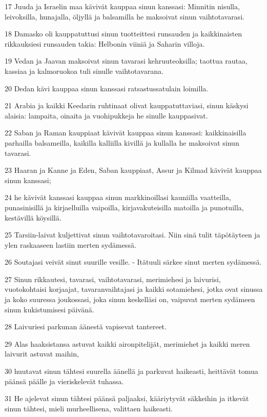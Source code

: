 \par 17 Juuda ja Israelin maa kävivät kauppaa sinun kanssasi: Minnitin nisulla, leivoksilla, hunajalla, öljyllä ja balsamilla he maksoivat sinun vaihtotavarasi.
\par 18 Damasko oli kauppatuttusi sinun tuotteittesi runsauden ja kaikkinaisten rikkauksiesi runsauden takia: Helbonin viiniä ja Saharin villoja.
\par 19 Vedan ja Jaavan maksoivat sinun tavarasi kehruuteoksilla; taottua rautaa, kassiaa ja kalmoruokoa tuli sinulle vaihtotavarana.
\par 20 Dedan kävi kauppaa sinun kanssasi ratsastussatulain loimilla.
\par 21 Arabia ja kaikki Keedarin ruhtinaat olivat kauppatuttaviasi, sinun käskysi alaisia: lampaita, oinaita ja vuohipukkeja he sinulle kauppasivat.
\par 22 Saban ja Raman kauppiaat kävivät kauppaa sinun kanssasi: kaikkinaisilla parhailla balsameilla, kaikilla kalliilla kivillä ja kullalla he maksoivat sinun tavarasi.
\par 23 Haaran ja Kanne ja Eden, Saban kauppiaat, Assur ja Kilmad kävivät kauppaa sinun kanssasi;
\par 24 he kävivät kanssasi kauppaa sinun markkinoillasi kauniilla vaatteilla, punasinisillä ja kirjaelluilla vaipoilla, kirjavakuteisilla matoilla ja punotuilla, kestävillä köysillä.
\par 25 Tarsiin-laivat kuljettivat sinun vaihtotavaroitasi. Niin sinä tulit täpötäyteen ja ylen raskaaseen lastiin merten sydämessä.
\par 26 Soutajasi veivät sinut suurille vesille. - Itätuuli särkee sinut merten sydämessä.
\par 27 Sinun rikkautesi, tavarasi, vaihtotavarasi, merimiehesi ja laivurisi, vuotokohtaisi korjaajat, tavaranvaihtajasi ja kaikki sotamiehesi, jotka ovat sinussa ja koko suuressa joukossasi, joka sinun keskelläsi on, vaipuvat merten sydämeen sinun kukistumisesi päivänä.
\par 28 Laivuriesi parkunan äänestä vapisevat tantereet.
\par 29 Alas haaksistansa astuvat kaikki aironpitelijät, merimiehet ja kaikki meren laivurit astuvat maihin,
\par 30 huutavat sinun tähtesi suurella äänellä ja parkuvat haikeasti, heittävät tomua päänsä päälle ja vieriskelevät tuhassa.
\par 31 He ajelevat sinun tähtesi päänsä paljaaksi, kääriytyvät säkkeihin ja itkevät sinun tähtesi, mieli murheellisena, valittaen haikeasti.
